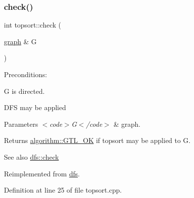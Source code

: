 \subsubsection{\texorpdfstring{check()}{check()}}
{\footnotesize\ttfamily int topsort\+::check (\begin{DoxyParamCaption}\item[{\mbox{\hyperlink{classgraph}{graph}} \&}]{G }\end{DoxyParamCaption})\hspace{0.3cm}{\ttfamily [virtual]}}

Preconditions\+: 
\begin{DoxyItemize}
\item {\ttfamily G} is directed. 
\item D\+FS may be applied 
\end{DoxyItemize}


\begin{DoxyParams}{Parameters}
{\em $<$code$>$\+G$<$/code$>$} & graph. \\
\hline
\end{DoxyParams}
\begin{DoxyReturn}{Returns}
{\ttfamily \mbox{\hyperlink{classalgorithm_af1a0078e153aa99c24f9bdf0d97f6710a5114c20e4a96a76b5de9f28bf15e282b}{algorithm\+::\+G\+T\+L\+\_\+\+OK}}} if topsort may be applied to {\ttfamily G}. 
\end{DoxyReturn}
\begin{DoxySeeAlso}{See also}
\mbox{\hyperlink{classdfs_a1af70060897529e67910f589b047e576}{dfs\+::check}} 
\end{DoxySeeAlso}


Reimplemented from \mbox{\hyperlink{classdfs_a1af70060897529e67910f589b047e576}{dfs}}.



Definition at line 25 of file topsort.\+cpp.


